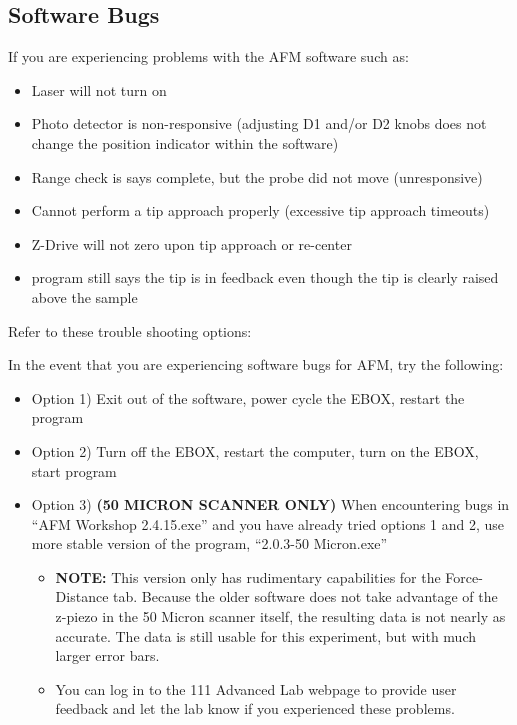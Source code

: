 \documentclass{../lab}
\begin{document}
\subsection{Software Bugs}

If you are experiencing problems with the AFM software such as:

\begin{itemize}
    \item Laser will not turn on

    \item Photo detector is non-responsive (adjusting D1 and/or D2 knobs does not change the position indicator within the software)

    \item Range check is says complete, but the probe did not move (unresponsive)

    \item Cannot perform a tip approach properly (excessive tip approach timeouts)

    \item Z-Drive will not zero upon tip approach or re-center

    \item program still says the tip is in feedback even though the tip is clearly raised above the sample

\end{itemize}

Refer to these trouble shooting options:

In the event that you are experiencing software bugs for AFM, try the following:

\begin{itemize}
    \item Option 1) Exit out of the software, power cycle the EBOX, restart the program

    \item Option 2) Turn off the EBOX, restart the computer, turn on the EBOX, start program

    \item Option 3) \textbf{(50 MICRON SCANNER ONLY)} When encountering bugs in ``AFM Workshop 2.4.15.exe'' and you have already tried options 1 and 2, use more stable version of the program, ``2.0.3-50 Micron.exe''
    \begin{itemize}
        \item \textbf{NOTE:} This version only has rudimentary capabilities for the Force-Distance tab.  Because the older software does not take advantage of the z-piezo in the 50 Micron scanner itself, the resulting data is not nearly as accurate.  The data is still usable for this experiment, but with much larger error bars.

        \item You can log in to the 111 Advanced Lab webpage to provide user feedback and let the lab know if you experienced these problems.

    \end{itemize}

\end{itemize}
\end{document}
